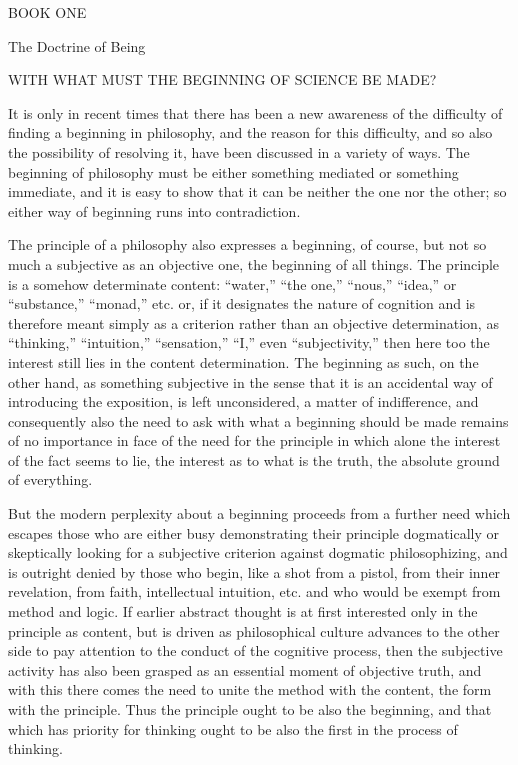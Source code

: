 BOOK ONE

The Doctrine of Being

WITH WHAT MUST THE BEGINNING OF SCIENCE BE MADE?

It is only in recent times that
there has been a new awareness of
the difficulty of finding a beginning in philosophy,
and the reason for this difficulty,
and so also the possibility of resolving it,
have been discussed in a variety of ways.
The beginning of philosophy must be either
something mediated or something immediate,
and it is easy to show that it can be
neither the one nor the other;
so either way of beginning runs into contradiction.

The principle of a philosophy also
expresses a beginning, of course,
but not so much a subjective as an objective one,
the beginning of all things.
The principle is a somehow determinate content:
“water,” “the one,” “nous,” “idea,” or “substance,” “monad,” etc.
or, if it designates the nature of cognition
and is therefore meant simply as a criterion
rather than an objective determination,
as “thinking,” “intuition,” “sensation,” “I,” even “subjectivity,”
then here too the interest still lies in the content determination.
The beginning as such, on the other hand,
as something subjective in the sense that
it is an accidental way of introducing the exposition,
is left unconsidered, a matter of indifference,
and consequently also the need to ask
with what a beginning should be made remains
of no importance in face of the need for the principle
in which alone the interest of the fact seems to lie,
the interest as to what is the truth,
the absolute ground of everything.

But the modern perplexity about a beginning
proceeds from a further need which escapes
those who are either busy demonstrating
their principle dogmatically or skeptically looking for
a subjective criterion against dogmatic philosophizing,
and is outright denied by those who begin,
like a shot from a pistol,
from their inner revelation,
from faith, intellectual intuition, etc.
and who would be exempt from method and logic.
If earlier abstract thought is at first interested only
in the principle as content,
but is driven as philosophical culture advances
to the other side to pay attention to
the conduct of the cognitive process,
then the subjective activity has also been grasped
as an essential moment of objective truth,
and with this there comes the need to unite
the method with the content,
the form with the principle.
Thus the principle ought to be
also the beginning,
and that which has priority for thinking
ought to be also the first
in the process of thinking.

